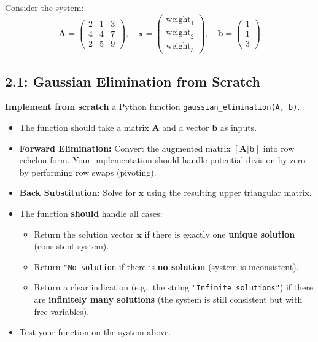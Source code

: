 \documentclass[12pt]{article}
\begin{document}
Consider the system:
$$ \mathbf{A} = \begin{pmatrix} 2 & 1 & 3 \\ 4 & 4 & 7 \\ 2 & 5 & 9 \end{pmatrix}, \quad \mathbf{x} = \begin{pmatrix} \text{weight}_1 \\ \text{weight}_2 \\ \text{weight}_3 \end{pmatrix}, \quad \mathbf{b} = \begin{pmatrix} 1 \\ 1 \\ 3 \end{pmatrix} $$

\subsection*{2.1: Gaussian Elimination from Scratch}
\textbf{Implement from scratch} a Python function \texttt{gaussian\_elimination(A, b)}.
\begin{itemize}
    \item The function should take a matrix $\mathbf{A}$ and a vector $\mathbf{b}$ as inputs.
    \item \textbf{Forward Elimination:} Convert the augmented matrix $[\mathbf{A}|\mathbf{b}]$ into row echelon form. Your implementation should handle potential division by zero by performing row swaps (pivoting).
    \item \textbf{Back Substitution:} Solve for $\mathbf{x}$ using the resulting upper triangular matrix.
    \item The function \textbf{should} handle all cases:
\begin{itemize}
    \item Return the solution vector $\mathbf{x}$ if there is exactly one \textbf{unique solution} (consistent system).
    \item Return \texttt{"No solution} if there is \textbf{no solution} (system is inconsistent).
    \item Return a clear indication (e.g., the string \texttt{"Infinite solutions"}) if there are \textbf{infinitely many solutions} (the system is still consistent but with free variables).
\end{itemize}


    \item Test your function on the system above.
\end{itemize}
\end{document}
